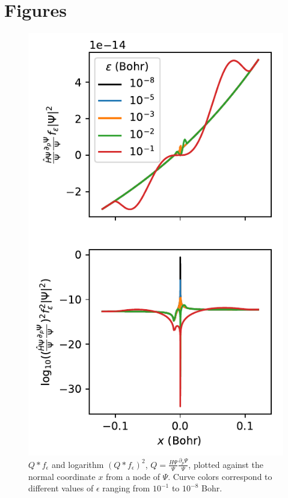 \documentclass{article}
\begin{document}
\section{Figures}
\begin{figure}
\centering
\includegraphics{../2_plots/viznode.pdf}
\caption{$Q * f_\epsilon$ and logarithm $(Q * f_\epsilon)^2$, $Q = \frac{H\Psi}{\Psi}\frac{\partial_p \Psi}{\Psi}$,  plotted against the normal coordinate $x$ from a node of $\Psi$. Curve colors correspond to different values of $\epsilon$ ranging from $10^{-1}$ to $10^{-8}$ Bohr.}
\end{figure}
\end{document}
